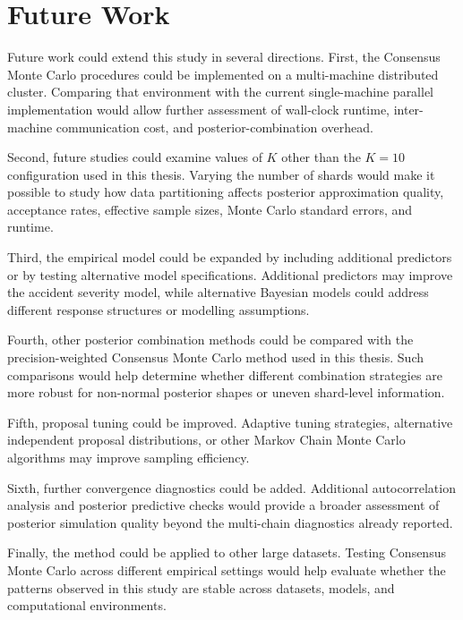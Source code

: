 \section{Future Work}

Future work could extend this study in several directions. First, the Consensus Monte Carlo procedures could be implemented on a multi-machine distributed cluster. Comparing that environment with the current single-machine parallel implementation would allow further assessment of wall-clock runtime, inter-machine communication cost, and posterior-combination overhead.

Second, future studies could examine values of $K$ other than the $K=10$ configuration used in this thesis. Varying the number of shards would make it possible to study how data partitioning affects posterior approximation quality, acceptance rates, effective sample sizes, Monte Carlo standard errors, and runtime.

Third, the empirical model could be expanded by including additional predictors or by testing alternative model specifications. Additional predictors may improve the accident severity model, while alternative Bayesian models could address different response structures or modelling assumptions.

Fourth, other posterior combination methods could be compared with the precision-weighted Consensus Monte Carlo method used in this thesis. Such comparisons would help determine whether different combination strategies are more robust for non-normal posterior shapes or uneven shard-level information.

Fifth, proposal tuning could be improved. Adaptive tuning strategies, alternative independent proposal distributions, or other Markov Chain Monte Carlo algorithms may improve sampling efficiency.

Sixth, further convergence diagnostics could be added. Additional autocorrelation analysis and posterior predictive checks would provide a broader assessment of posterior simulation quality beyond the multi-chain diagnostics already reported.

Finally, the method could be applied to other large datasets. Testing Consensus Monte Carlo across different empirical settings would help evaluate whether the patterns observed in this study are stable across datasets, models, and computational environments.
